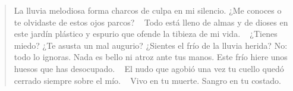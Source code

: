 \documentclass[a4paper, 12pt]{article}
\begin{document}
\pagebreak 


\begin{verse}
    
La lluvia melodiosa forma charcos 
de culpa en mi silencio. ¿Me conoces
o te olvidaste de estos ojos parcos?
~
Todo está lleno de almas y de dioses
en este jardín plástico y espurio
que ofende la tibieza de mi vida.
~
¿Tienes miedo? ¿Te asusta un mal augurio?
¿Sientes el frío de la lluvia herida?
No: todo lo ignoras. Nada es bello
ni atroz ante tus manos. Este frío 
hiere unos huesos que has desocupado.
~
El nudo que agobió una vez tu cuello
quedó cerrado siempre sobre el mío.
~
Vivo en tu muerte. Sangro en tu costado.
\end{verse}
\end{document}
